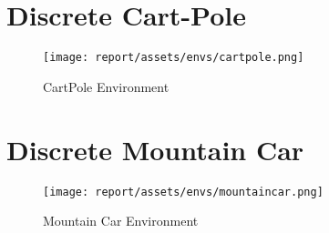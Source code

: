 \section{Discrete Cart-Pole}
\begin{figure}[h!]
    \centering
    \texttt{[image: report/assets/envs/cartpole.png]}
    \caption{CartPole Environment \citep{1606.01540, 6313077}}
    \label{fig:cartpole}
\end{figure}
\citep{1606.01540, 6313077}
\section{Discrete Mountain Car}
\begin{figure}[h!]
    \centering
    \texttt{[image: report/assets/envs/mountaincar.png]}
    \caption{Mountain Car Environment \citep{1606.01540, Moore90efficientmemory-based}}
    \label{fig:cartpole}
\end{figure}
\citep{1606.01540, Moore90efficientmemory-based}